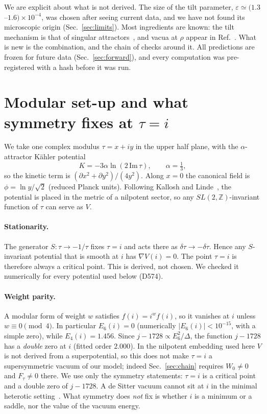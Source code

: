 \documentclass[aps,prd,twocolumn,superscriptaddress,nofootinbib,floatfix]{revtex4-2}
\begin{document}
We are explicit about what is not derived. The size of the tilt parameter, $\varepsilon \simeq (1.3$--$1.6)\times10^{-4}$, was chosen after seeing current data, and we have not found its microscopic origin (Sec.~\ref{sec:limits}). Most ingredients are known: the tilt mechanism is that of singular attractors~\cite{arXiv_2512_02969}, and vacua at $\rho$ appear in Ref.~\cite{arXiv_2408_05203}. What is new is the combination, and the chain of checks around it. All predictions are frozen for future data (Sec.~\ref{sec:forward}), and every computation was pre-registered with a hash before it was run.

\section{Modular set-up and what symmetry fixes at $\tau = i$}\label{sec:setup}
We take one complex modulus $\tau = x + i y$ in the upper half plane, with the $\alpha$-attractor K\"ahler potential
\begin{equation}
K = -3\alpha \ln(2\,\mathrm{Im}\,\tau), \qquad \alpha = \tfrac13,
\end{equation}
so the kinetic term is $(\partial x^2 + \partial y^2)/(4y^2)$. Along $x = 0$ the canonical field is $\phi = \ln y/\sqrt{2}$ (reduced Planck units). Following Kallosh and Linde~\cite{arXiv_2408_05203}, the potential is placed in the metric of a nilpotent sector, so any $SL(2,\mathbb{Z})$-invariant function of $\tau$ can serve as $V$.

\paragraph{Stationarity.} The generator $S:\tau\to-1/\tau$ fixes $\tau = i$ and acts there as $\delta\tau \to -\delta\tau$. Hence any $S$-invariant potential that is smooth at $i$ has $\nabla V(i) = 0$. The point $\tau = i$ is therefore always a critical point. This is derived, not chosen. We checked it numerically for every potential used below (D574).

\paragraph{Weight parity.} A modular form of weight $w$ satisfies $f(i) = i^{w} f(i)$, so it vanishes at $i$ unless $w \equiv 0 \pmod 4$. In particular $E_6(i) = 0$ (numerically $|E_6(i)| < 10^{-15}$, with a simple zero), while $E_4(i) = 1.456$. Since $j - 1728 \propto E_6^2/\Delta$, the function $j-1728$ has a \emph{double} zero at $i$ (fitted order $2.000$). In the nilpotent embedding used here $V$ is not derived from a superpotential, so this does not make $\tau=i$ a supersymmetric vacuum of our model; indeed Sec.~\ref{sec:chain} requires $W_0\neq0$ and $F_\tau\neq0$ there. We use only the symmetry statements: $\tau=i$ is a critical point and a double zero of $j-1728$. A de Sitter vacuum cannot sit at $i$ in the minimal heterotic setting~\cite{arXiv_2212_03876}. What symmetry does \emph{not} fix is whether $i$ is a minimum or a saddle, nor the value of the vacuum energy.
\end{document}
